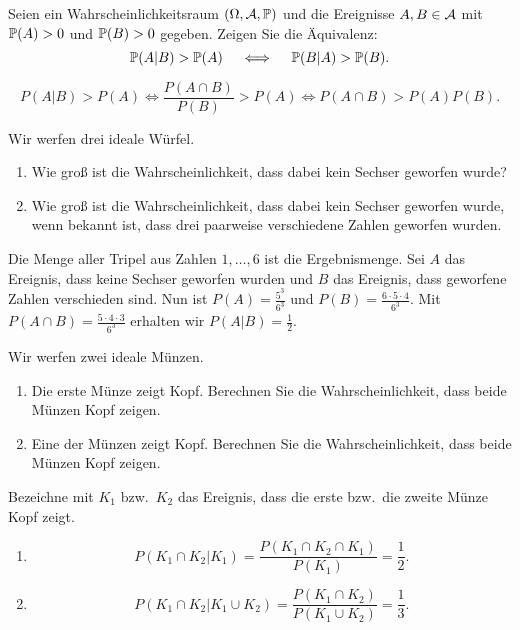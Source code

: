 Seien ein Wahrscheinlichkeitsraum $\left( \Omega, \mathcal A, \mathbb P \right)$ und die
Ereignisse $A,B\in \mathcal A$ mit $\mathbb P(A)>0$ und $\mathbb P(B)>0$ gegeben.  Zeigen Sie die
Äquivalenz:
\begin{equation*}
    \mathbb P(A | B ) > \mathbb P(A) \quad \iff \quad \mathbb P(B | A) > \mathbb P(B).
\end{equation*}

\solution
\begin{equation*}
    P(A|B)>P(A) \iff \frac{ P(A \cap B) }{ P(B)} > P(A) \iff P(A \cap B) > P(A)P(B).
\end{equation*}


 Wir werfen drei ideale Würfel. 
\begin{enumerate}
    \item Wie groß ist die Wahrscheinlichkeit, dass dabei kein Sechser geworfen wurde? 
    \item Wie groß ist die Wahrscheinlichkeit, dass dabei kein Sechser geworfen wurde, wenn
        bekannt ist, dass drei paarweise verschiedene Zahlen geworfen wurden. 
\end{enumerate}

\solution Die Menge aller Tripel aus Zahlen $1,\dots,6$ ist die Ergebnismenge.
Sei $A$ das Ereignis, dass keine Sechser geworfen wurden und $B$ das Ereignis,
dass geworfene Zahlen verschieden sind. Nun ist $P(A) = \frac{5^3}{6^3}$ und
$P(B)= \frac{6\cdot 5\cdot 4}{6^{3}}$. Mit $P(A \cap B) = \frac{5\cdot 4\cdot
3}{6^{3}}$ erhalten wir $P(A|B)=\frac{1}{2}$.


 Wir werfen zwei ideale Münzen.
\begin{enumerate}
    \item Die erste Münze zeigt Kopf. Berechnen Sie die Wahrscheinlichkeit,
        dass beide Münzen Kopf zeigen.

    \item Eine der Münzen zeigt Kopf. Berechnen Sie die Wahrscheinlichkeit,
        dass beide Münzen Kopf zeigen.
\end{enumerate}

\solution Bezeichne mit $K_1$ bzw.\ $K_2$ das Ereignis, dass die erste
bzw.\ die zweite Münze Kopf zeigt. 
\begin{enumerate}
    \item \begin{equation*}
            P( K_1 \cap K_2 | K_1 ) = \frac{ P( K_1 \cap K_2 \cap K_1) }{ P(K_1)} = \frac{1}{2}.
        \end{equation*}

    \item \begin{equation*}
            P( K_1 \cap K_2 | K_1 \cup K_2 ) = \frac{ P( K_1 \cap K_2) }{ P(K_1 \cup K_2) }
            = \frac{1}{3}. 
        \end{equation*}
\end{enumerate}


